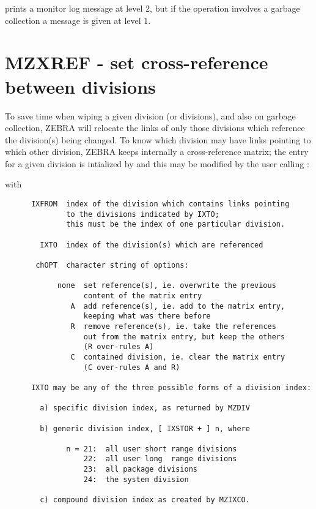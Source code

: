  prints a monitor log message at level 2,
but if the operation involves a garbage collection
a message is given at level 1.

\section{MZXREF - set cross-reference between divisions}
\label{sec:MZXREF}

To save time when wiping a given division (or divisions),
and also on garbage collection,
ZEBRA will relocate the links of only those divisions
which reference the division(s) being changed.
To know which division may have links pointing
to which other division,
ZEBRA keeps internally a cross-reference matrix;
the entry for a given division is intialized by 
and this may be modified by the user calling :


with
\begin{verbatim}
      IXFROM  index of the division which contains links pointing
              to the divisions indicated by IXTO;
              this must be the index of one particular division.

        IXTO  index of the division(s) which are referenced

       chOPT  character string of options:

            none  set reference(s), ie. overwrite the previous
                  content of the matrix entry
               A  add reference(s), ie. add to the matrix entry,
                  keeping what was there before
               R  remove reference(s), ie. take the references
                  out from the matrix entry, but keep the others
                  (R over-rules A)
               C  contained division, ie. clear the matrix entry
                  (C over-rules A and R)

      IXTO may be any of the three possible forms of a division index:

        a) specific division index, as returned by MZDIV

        b) generic division index, [ IXSTOR + ] n, where

              n = 21:  all user short range divisions
                  22:  all user long  range divisions
                  23:  all package divisions
                  24:  the system division

        c) compound division index as created by MZIXCO.
\end{verbatim} 

